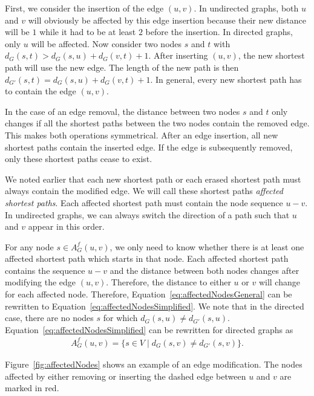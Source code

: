 First, we consider the insertion of the edge $(u, v)$. In undirected graphs, both $u$ and $v$ will obviously be affected by this edge insertion because their new distance will be $1$ while it had to be at least $2$ before the insertion. In directed graphs, only $u$ will be affected. Now consider two nodes $s$ and $t$ with $d_G(s, t) > d_G(s, u) + d_G(v, t) + 1$. After inserting $(u, v)$, the new shortest path will use the new edge. The length of the new path is then $d_{G'}(s, t) = d_G(s, u) + d_G(v, t) + 1$. In general, every new shortest path has to contain the edge $(u, v)$.

In the case of an edge removal, the distance between two nodes $s$ and $t$ only changes if all the shortest paths between the two nodes contain the removed edge. This makes both operations symmetrical. After an edge insertion, all new shortest paths contain the inserted edge. If the edge is subsequently removed, only these shortest paths cease to exist.

We noted earlier that each new shortest path or each erased shortest path must always contain the modified edge. We will call these shortest paths \emph{affected shortest paths}. Each affected shortest path must contain the node sequence $u - v$. In undirected graphs, we can always switch the direction of a path such that $u$ and $v$ appear in this order.

For any node $s \in A_G^f(u, v)$, we only need to know whether there is at least one affected shortest path which starts in that node. Each affected shortest path contains the sequence $u - v$ and the distance between both nodes changes after modifying the edge $(u, v)$. Therefore, the distance to either $u$ or $v$ will change for each affected node. Therefore, Equation~\ref{eq:affectedNodesGeneral} can be rewritten to Equation~\ref{eq:affectedNodesSimplified}. We note that in the directed case, there are no nodes $s$ for which $d_G(s, u) \neq d_{G'}(s, u)$. Equation~\ref{eq:affectedNodesSimplified} can be rewritten for directed graphs as
\begin{align}
	A_G^f(u, v) = \{s \in V \mid d_G(s, v) \neq d_{G'}(s, v)\} \label{eq:affectedNodesSimplifiedDirected}.
\end{align}

Figure~\ref{fig:affectedNodes} shows an example of an edge modification. The nodes affected by either removing or inserting the dashed edge between $u$ and $v$ are marked in red.



